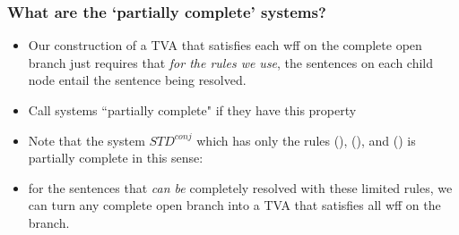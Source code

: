 \begin{frame}
\frametitle{What are the `partially complete' systems?}

\begin{itemize}[<+->]

\item Our construction of a TVA that satisfies each wff on the complete open branch just requires that \textit{for the rules we use}, the sentences on each child node entail the sentence being resolved. 

\item Call systems ``partially complete" if they have this property

\item Note that the system $STD^{conj}$ which has only the rules (\enot), (\eand), and (\enot \eand) is partially complete in this sense: 

\item for the sentences that \textit{can be} completely resolved with these limited rules, we can turn any complete open branch into a TVA that satisfies all wff on the branch. 

\end{itemize}
\end{frame}

\iffalse 

